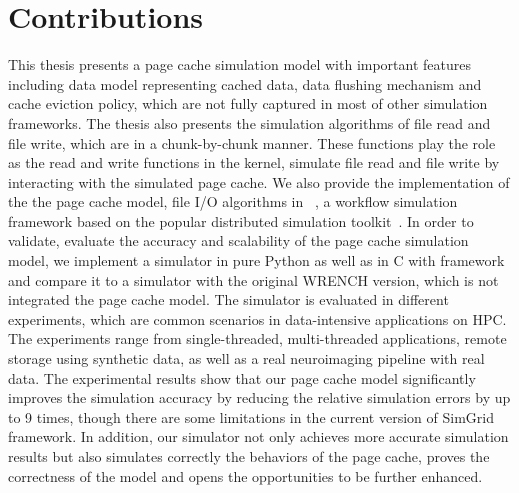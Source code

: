 \section{Contributions}

This thesis presents a page cache simulation model with important features 
including data model representing cached data, data flushing mechanism and 
cache eviction policy, which are not fully captured in most of other 
simulation frameworks. 
The thesis also presents the simulation algorithms of file read and file write, 
which are in a chunk-by-chunk manner. 
These functions play the role as the read and write functions in the kernel, 
simulate file read and file write by interacting with the simulated page cache.
We also provide the implementation of the the page cache model, 
file I/O algorithms in \wrench~\cite{casanova2020fgcs}, 
a workflow simulation framework based on the popular 
\simgrid distributed simulation toolkit~\cite{casanova2014simgrid}. 
In order to validate, evaluate the accuracy and scalability of the page cache 
simulation model, we implement a simulator in pure Python as well as 
in C with \wrench framework and compare it to a simulator with the original 
WRENCH version, which is not integrated the page cache model. 
The simulator is evaluated in different experiments, which are common 
scenarios in data-intensive applications on HPC.
The experiments range from single-threaded, multi-threaded applications, 
remote storage using synthetic data, as well as a real neuroimaging pipeline 
with real data.
The experimental results show that our page cache model significantly improves 
the simulation accuracy by reducing the relative simulation errors by up to 9 times, 
though there are some limitations in the current version of SimGrid framework. 
In addition, our simulator not only achieves more accurate simulation results 
but also simulates correctly the behaviors of the page cache, proves the correctness 
of the model and opens the opportunities to be further enhanced. 


